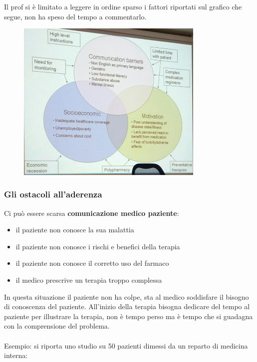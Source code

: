 Il prof si è limitato a leggere in ordine sparso i fattori riportati sul
grafico che segue, non ha speso del tempo a commentarlo.

\begin{figure}[!ht]
\centering
	\includegraphics[width=0.8\textwidth]{41/image6.jpeg}
	\end{figure}
	
\subsubsection{Gli ostacoli all'aderenza}

Ci può essere scarsa \textbf{comunicazione medico paziente}:

\begin{itemize}
\item
  il paziente non conosce la sua malattia
\item
  il paziente non conosce i rischi e benefici della terapia
\item
  il paziente non conosce il corretto uso del farmaco
\item
  il medico prescrive un terapia troppo complessa
\end{itemize}

In questa situazione il paziente non ha colpe, sta al medico soddisfare
il bisogno di conoscenza del paziente. All'inizio della terapia bisogna
dedicare del tempo al paziente per illustrare la terapia, non è tempo
perso ma è tempo che si guadagna con la comprensione del problema.
\\\\
Esempio: si riporta uno studio su 50 pazienti dimessi da un reparto di
medicina interna:

